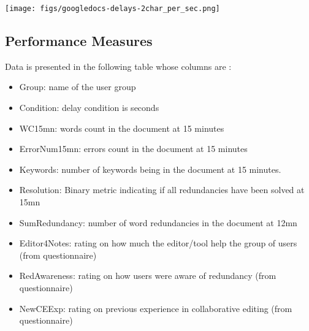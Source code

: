\documentclass[10pt]{article}
\begin{document}
\texttt{[image: figs/googledocs-delays-2char\_per\_sec.png]}



\subsection{Performance Measures}
\label{sec-2-2}

Data is presented in the following table whose columns are :
\begin{itemize}
\item Group: name of the user group
\item Condition: delay condition is seconds
\item WC15mn: words count in the document at 15 minutes
\item ErrorNum15mn: errors count in the document at 15 minutes
\item Keywords: number of keywords being in the document at 15 minutes.
\item Resolution: Binary metric indicating if all redundancies have been
solved at 15mn
\item SumRedundancy: number of word redundancies in the document at 12mn
\item Editor4Notes: rating on how much the editor/tool help the group of users (from questionnaire)
\item RedAwareness: rating on how users were aware of redundancy (from questionnaire)
\item NewCEExp: rating on previous experience in collaborative editing (from questionnaire)
\end{itemize}
\end{document}

